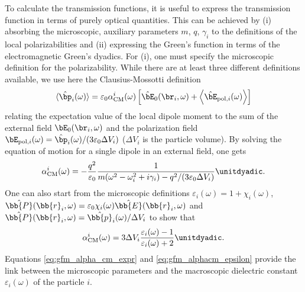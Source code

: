 To calculate the transmission functions, it is useful to express the transmission function in terms of purely optical quantities. This can be achieved by (i) absorbing the microscopic, auxiliary parameters $m$, $q$, $\gamma_i$ to the definitions of the local polarizabilities and (ii) expressing the Green's function in terms of the electromagnetic Green's dyadics. For (i), one must specify the microscopic definition for the polarizability. While there are at least three different definitions available, we use here the Clausius-Mossotti definition 
\begin{equation}
 \langle \hat \bp_i(\omega) \rangle = \varepsilon_0 \alpha_{\textrm{CM}}^i(\omega) \left[\hat \bE_0(\br_i,\omega)+ \left\langle \hat \bE_{\textrm{pol},i} (\omega) \right\rangle \right]
\end{equation}
relating the expectation value of the local dipole moment to the sum of the external field $\bE_0(\br_i,\omega)$ and the polarization field $\bE_{\textrm{pol},i} (\omega)=\hat \bp_i(\omega) /(3\varepsilon_0 \Delta V_i)$ ($\Delta V_i$ is the particle volume). By solving the equation of motion for a single dipole in an external field, one gets 
\begin{equation}
 \alpha_{\textrm{CM}}^i(\omega) = - \frac{q^2}{\varepsilon_0} \frac{1}{m(\omega^2-\omega_i^2+i\gamma_i)-q^2/(3\varepsilon_0\Delta V_i)}\unitdyadic. \label{eq:gfm_alpha_cm_expr}
\end{equation}
One can also start from the microscopic definitions $\varepsilon_i(\omega)=1+\chi_i(\omega)$, $\hat{\bb{P}}(\bb{r}_i,\omega)=\varepsilon_0 \chi_i(\omega) \hat{\bb{E}}(\bb{r}_i,\omega)$ and $\hat{\bb{P}}(\bb{r}_i,\omega)=\hat{\bb{p}}_i(\omega)/\Delta V_i$ to show that
\begin{equation}
 \alpha_{\textrm{CM}}^i(\omega) = 3\Delta V_i \frac{\varepsilon_i(\omega)-1}{\varepsilon_i(\omega)+2} \unitdyadic. \label{eq:gfm_alphacm_epsilon}
\end{equation}
Equations \eqref{eq:gfm_alpha_cm_expr} and \eqref{eq:gfm_alphacm_epsilon} provide the link between the microscopic parameters and the macroscopic dielectric constant $\varepsilon_i(\omega)$ of the particle $i$.

